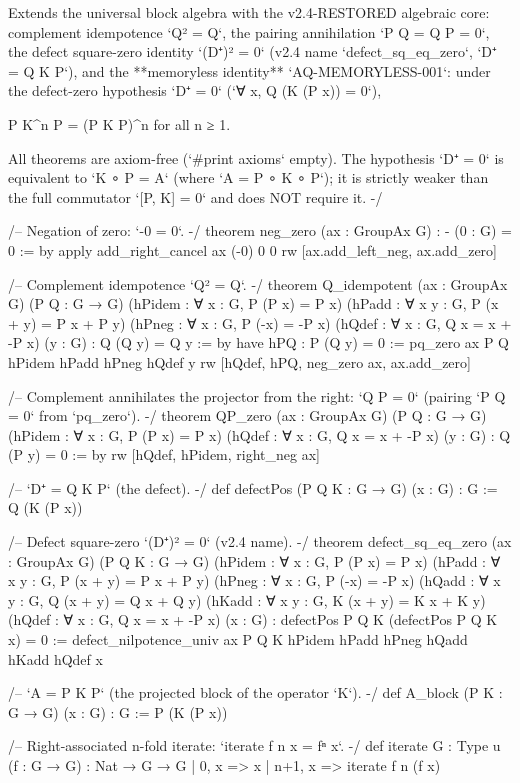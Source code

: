Extends the universal block algebra with the v2.4-RESTORED algebraic core:
complement idempotence `Q² = Q`, the pairing annihilation `P Q = Q P = 0`,
the defect square-zero identity `(D⁺)² = 0` (v2.4 name `defect_sq_eq_zero`,
`D⁺ = Q K P`), and the **memoryless identity** `AQ-MEMORYLESS-001`:
under the defect-zero hypothesis `D⁺ = 0` (`∀ x, Q (K (P x)) = 0`),

    P K^n P = (P K P)^n   for all n ≥ 1.

All theorems are axiom-free (`#print axioms` empty). The hypothesis `D⁺ = 0`
is equivalent to `K ∘ P = A` (where `A = P ∘ K ∘ P`); it is strictly weaker
than the full commutator `[P, K] = 0` and does NOT require it.
-/

/-- Negation of zero: `-0 = 0`. -/
theorem neg_zero (ax : GroupAx G) : - (0 : G) = 0 := by
  apply add_right_cancel ax (-0) 0 0
  rw [ax.add_left_neg, ax.add_zero]

/-- Complement idempotence `Q² = Q`. -/
theorem Q_idempotent (ax : GroupAx G) (P Q : G → G)
    (hPidem : ∀ x : G, P (P x) = P x)
    (hPadd : ∀ x y : G, P (x + y) = P x + P y)
    (hPneg : ∀ x : G, P (-x) = -P x)
    (hQdef : ∀ x : G, Q x = x + -P x)
    (y : G) : Q (Q y) = Q y := by
  have hPQ : P (Q y) = 0 := pq_zero ax P Q hPidem hPadd hPneg hQdef y
  rw [hQdef, hPQ, neg_zero ax, ax.add_zero]

/-- Complement annihilates the projector from the right: `Q P = 0`
    (pairing `P Q = 0` from `pq_zero`). -/
theorem QP_zero (ax : GroupAx G) (P Q : G → G)
    (hPidem : ∀ x : G, P (P x) = P x)
    (hQdef : ∀ x : G, Q x = x + -P x)
    (y : G) : Q (P y) = 0 := by
  rw [hQdef, hPidem, right_neg ax]

/-- `D⁺ = Q K P` (the defect). -/
def defectPos (P Q K : G → G) (x : G) : G := Q (K (P x))

/-- Defect square-zero `(D⁺)² = 0` (v2.4 name). -/
theorem defect_sq_eq_zero (ax : GroupAx G) (P Q K : G → G)
    (hPidem : ∀ x : G, P (P x) = P x)
    (hPadd : ∀ x y : G, P (x + y) = P x + P y)
    (hPneg : ∀ x : G, P (-x) = -P x)
    (hQadd : ∀ x y : G, Q (x + y) = Q x + Q y)
    (hKadd : ∀ x y : G, K (x + y) = K x + K y)
    (hQdef : ∀ x : G, Q x = x + -P x)
    (x : G) : defectPos P Q K (defectPos P Q K x) = 0 :=
  defect_nilpotence_univ ax P Q K hPidem hPadd hPneg hQadd hKadd hQdef x

/-- `A = P K P` (the projected block of the operator `K`). -/
def A_block (P K : G → G) (x : G) : G := P (K (P x))

/-- Right-associated n-fold iterate: `iterate f n x = fⁿ x`. -/
def iterate {G : Type u} (f : G → G) : Nat → G → G
  | 0, x => x
  | n+1, x => iterate f n (f x)

